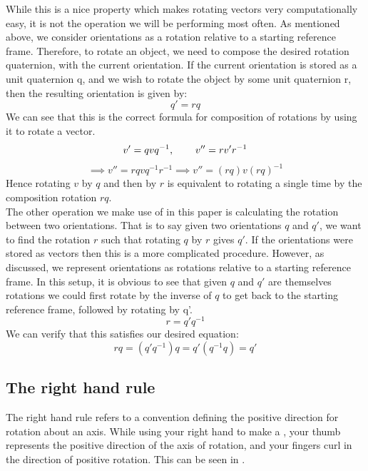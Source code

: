 While this is a nice property which makes rotating vectors very computationally easy, it is not the operation we will be performing most often. As mentioned above, we consider orientations as a rotation relative to a starting reference frame. Therefore, to rotate an object, we need to compose the desired rotation quaternion, with the current orientation. If the current orientation is stored as a unit quaternion q, and we wish to rotate the object by some unit quaternion r, then the resulting orientation is given by:
$$q' = rq$$
We can see that this is the correct formula for composition of rotations by using it to rotate a vector.
$$v' = qvq^{-1}, \operatorname{\operatorname{\: \: \: \:} \operatorname{\: \: \: \:}} v'' = rv'r^{-1}$$
$$\implies v'' = rqvq^{-1}r^{-1} \implies v'' = (rq)v(rq)^{-1}$$
Hence rotating $v$ by $q$ and then by $r$ is equivalent to rotating a single time by the composition rotation $rq$.\\

The other operation we make use of in this paper is calculating the rotation between two orientations. That is to say given two orientations $q$ and $q'$, we want to find the rotation $r$ such that rotating $q$ by $r$ gives $q'$. If the orientations were stored as vectors then this is a more complicated procedure. However, as discussed, we represent orientations as rotations relative to a starting reference frame. In this setup, it is obvious to see that given $q$ and $q'$ are themselves rotations we could first rotate by the inverse of $q$ to get back to the starting reference frame, followed by rotating by q'.
$$r = q'q^{-1}$$
We can verify that this satisfies our desired equation:
$$rq = (q'q^{-1})q = q'(q^{-1}q) = q'$$


\subsection{The right hand rule}
\label{subsec:right-hand-rule}
The right hand rule refers to a convention defining the positive direction for rotation about an axis. While using your right hand to make a , your thumb represents the positive direction of the axis of rotation, and your fingers curl in the direction of positive rotation. This can be seen in .\\

